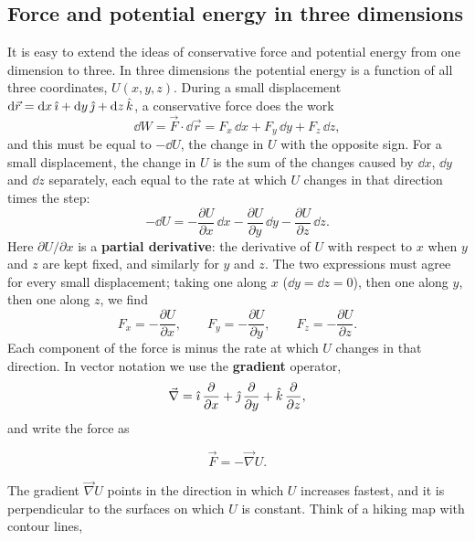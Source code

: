\documentclass[11pt,a4paper]{article}
\begin{document}
\subsection{Force and potential energy in three dimensions}\label{sec:3d}

It is easy to extend the ideas of conservative force and potential energy from one dimension to
three. In three dimensions the potential energy is a function of all three coordinates,
$U(x, y, z)$. During a small displacement $\mathrm{d}\vec{r} = \mathrm{d} x\,\hat{\imath} + \mathrm{d} y\,\hat{\jmath} + \mathrm{d} z\,\hat{k}$,
a conservative force does the work
\[
  \dd W = \vec{F}\cdot\dd\vec{r} = F_x\,\dd x + F_y\,\dd y + F_z\,\dd z ,
\]
and this must be equal to $-\dd U$, the change in $U$ with the opposite sign. For a small
displacement, the change in $U$ is the sum of the changes caused by $\dd x$, $\dd y$ and $\dd z$
separately, each equal to the rate at which $U$ changes in that direction times the step:
\[
  -\dd U = -\frac{\partial U}{\partial x}\,\dd x - \frac{\partial U}{\partial y}\,\dd y
  - \frac{\partial U}{\partial z}\,\dd z .
\]
Here $\partial U/\partial x$ is a \textbf{partial derivative}: the derivative of $U$ with respect to $x$
when $y$ and $z$ are kept fixed, and similarly for $y$ and $z$. The two expressions must agree for
every small displacement; taking one along $x$ ($\dd y = \dd z = 0$), then one along $y$, then one
along $z$, we find
\begin{equation}\label{eq:F-partial}
  F_x = -\frac{\partial U}{\partial x} , \qquad F_y = -\frac{\partial U}{\partial y} , \qquad
  F_z = -\frac{\partial U}{\partial z} .
\end{equation}
Each component of the force is minus the rate at which $U$ changes in that direction. In vector
notation
we use the \textbf{gradient} operator,
\begin{equation}\label{eq:nabla}
  \vec{\nabla} = \hat{\imath}\,\frac{\partial}{\partial x} + \hat{\jmath}\,\frac{\partial}{\partial y}
  + \hat{k}\,\frac{\partial}{\partial z} ,
\end{equation}
and write the force as
\begin{keyresult}
\begin{equation}\label{eq:F-grad}
  \vec{F} = -\vec{\nabla} U .
\end{equation}
\end{keyresult}
The gradient $\vec{\nabla} U$ points in the direction in which $U$ increases fastest, and it is
perpendicular to the surfaces on which $U$ is constant. Think of a hiking map with contour lines,
\end{document}
